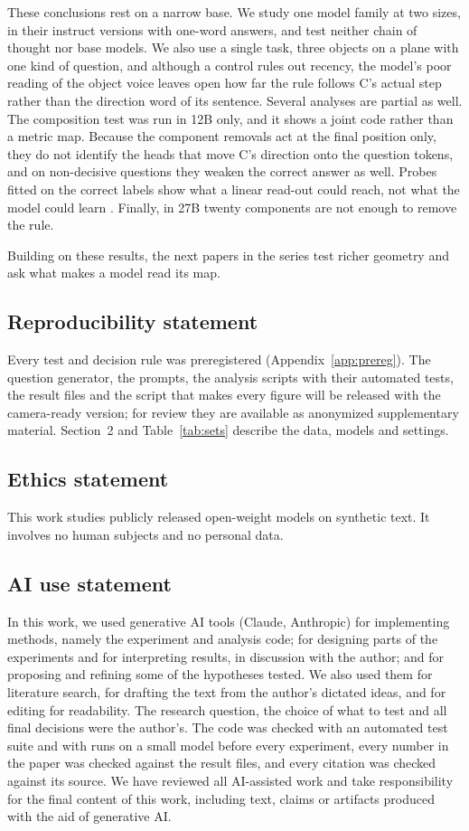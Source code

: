 \documentclass{article}
\begin{document}
These conclusions rest on a narrow base. We study one model family at two sizes, in their instruct versions with
one-word answers, and test neither chain of thought nor base models. We also use a single task, three objects on a
plane with one kind of question, and although a control rules out recency, the model's poor reading of the object voice leaves open how far the rule follows C's actual step rather than the direction word of its sentence.
Several analyses are partial as well. The composition test was run in 12B only, and it shows a joint code rather than a
metric map. Because the component removals act at the final position only, they do not identify the heads that move
C's direction onto the question tokens, and on non-decisive questions they weaken the correct answer as well. Probes
fitted on the correct labels show what a linear read-out could reach, not what the model could learn
\citep{hewitt2019control}. Finally, in 27B twenty components are not enough to remove the rule.

Building on these results, the next papers in the series test richer geometry and ask what makes a model read its map.

\subsection*{Reproducibility statement}
Every test and decision rule was preregistered (Appendix~\ref{app:prereg}). The question generator, the prompts, the
analysis scripts with their automated tests, the result files and the script that makes every figure will be released
with the camera-ready version; for review they are available as anonymized supplementary material. Section~2 and
Table~\ref{tab:sets} describe the data, models and settings.

\subsection*{Ethics statement}
This work studies publicly released open-weight models on synthetic text. It involves no human subjects and no
personal data.

\subsection*{AI use statement}
In this work, we used generative AI tools (Claude, Anthropic) for implementing methods, namely the experiment and
analysis code; for designing parts of the experiments and for interpreting results, in discussion with the author; and
for proposing and refining some of the hypotheses tested. We also used them for literature search, for drafting the
text from the author's dictated ideas, and for editing for readability. The research question, the choice of what to
test and all final decisions were the author's. The code was checked with an automated test suite and with runs on a
small model before every experiment, every number in the paper was checked against the result files, and every
citation was checked against its source. We have reviewed all AI-assisted work and take responsibility for the final
content of this work, including text, claims or artifacts produced with the aid of generative AI.
\end{document}

